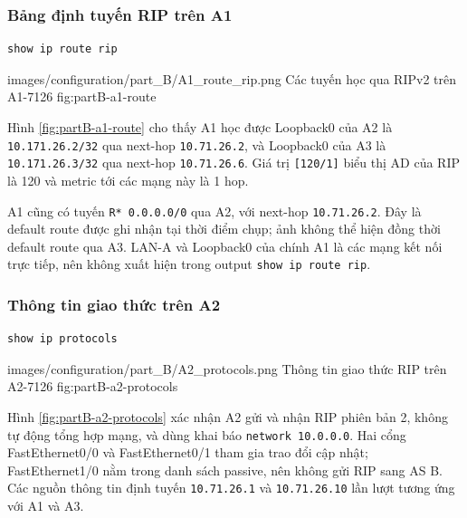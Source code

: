 \subsubsection{Bảng định tuyến RIP trên A1}

\begin{lstlisting}
show ip route rip
\end{lstlisting}

\partzeroimage
{images/configuration/part_B/A1_route_rip.png}
{Các tuyến học qua RIPv2 trên A1-7126}
{fig:partB-a1-route}

Hình \ref{fig:partB-a1-route} cho thấy A1 học
được Loopback0 của A2 là \texttt{10.171.26.2/32}
qua next-hop \texttt{10.71.26.2},
và Loopback0 của A3 là \texttt{10.171.26.3/32}
qua next-hop \texttt{10.71.26.6}.
Giá trị \texttt{[120/1]} biểu thị AD của RIP
là 120 và metric tới các mạng này là 1 hop.

A1 cũng có tuyến \texttt{R* 0.0.0.0/0}
qua A2, với next-hop \texttt{10.71.26.2}.
Đây là default route được ghi nhận
tại thời điểm chụp; ảnh không thể hiện
đồng thời default route qua A3.
LAN-A và Loopback0 của chính A1
là các mạng kết nối trực tiếp,
nên không xuất hiện trong output
\texttt{show ip route rip}.

\subsubsection{Thông tin giao thức trên A2}

\begin{lstlisting}
show ip protocols
\end{lstlisting}

\partzeroimage
{images/configuration/part_B/A2_protocols.png}
{Thông tin giao thức RIP trên A2-7126}
{fig:partB-a2-protocols}

Hình \ref{fig:partB-a2-protocols} xác nhận
A2 gửi và nhận RIP phiên bản 2,
không tự động tổng hợp mạng,
và dùng khai báo \texttt{network 10.0.0.0}.
Hai cổng FastEthernet0/0 và FastEthernet0/1
tham gia trao đổi cập nhật;
FastEthernet1/0 nằm trong danh sách passive,
nên không gửi RIP sang AS B.
Các nguồn thông tin định tuyến
\texttt{10.71.26.1} và \texttt{10.71.26.10}
lần lượt tương ứng với A1 và A3.

\newpage
